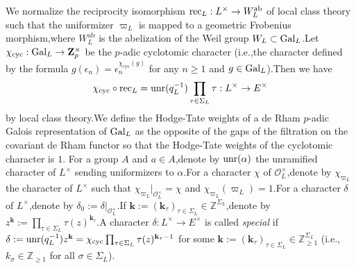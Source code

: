 \documentclass[SecEq,CM,GP]{degruyter-crelle} %
\theoremstyle{plain}
\newcommand{\ccyc}{{\chi_{\mathrm{cyc}}}}
\newcommand{\gal}{{\rm Gal}}
\newcommand{\rec}{{\rm rec}_L}
\newcommand{\unr}{{\rm unr}}
\newcommand{\BZ}{{\mathbb{Z}}}
\newcommand{\bZ}{{\mathbf{Z}}}
\newcommand{\bk}{{\mathbf{k}}}
\newcommand{\cO}{\mathcal O}
\begin{document}
We normalize the reciprocity isomorphism $\rec:L^\times\rightarrow W_L^{\mathrm{ab}}$ of local class theory such that the uniformizer $\varpi_{L}$ is mapped to a geometric Frobenius morphism,\;where $W_L^{\mathrm{ab}}$ is the abelization of the Weil group $W_L\subset \gal_L$.\;Let ${\ccyc}:\gal_L\rightarrow \bZ_p^\times$ be the $p$-adic cyclotomic character (i.e.,\;the character defined by the formula $g(\epsilon_n)=\epsilon_n^{{\ccyc}(g)}$ for any $n\geq 1$ and $g\in \gal_L$).\;Then we have 
\[{\ccyc}\circ\rec=\unr(q_L^{-1})\prod_{\tau\in \Sigma_L}\tau:L^\times\rightarrow E^\times\]
by local class theory.\;We define the Hodge-Tate weights of a de Rham $p$-adic Galois representation of $\gal_L$ as the opposite of the gaps of the filtration on the covariant de Rham functor so that the Hodge-Tate weights of the cyclotomic character is $1$.\;%
For a group $A$ and $a\in A$,\;denote by $\unr(\alpha)$ the unramified character of $L^\times$ sending uniformizers to $\alpha$.\;For a character $\chi$ of $\cO_L^\times$,\;denote by $\chi_{\varpi_L}$ the character of  $L^\times$ such that $\chi_{\varpi_L}|_{\cO_L^\times}=\chi$ and $\chi_{\varpi_L}(\varpi_L)=1$.\;For a character $\delta$ of $L^\times$,\;denote by $\delta_0:=\delta|_{\cO_L^\times}$.\;If $\bk:=(\bk_{\tau})_{\tau\in \Sigma_L}\in \BZ^{\Sigma_L}$,\;denote by $z^{\bk}:=\prod_{\tau\in  \Sigma_L}\tau(z)^{\bk_{\tau}}$.\;A character $\delta:L^\times \rightarrow E^\times$ is called \emph{special} if $\delta:=\unr(q_L^{-1})z^{\bk}={\ccyc}\prod_{\tau\in  \Sigma_L}\tau(z)^{\bk_{\tau}-1}$ for some $\bk:=(\bk_{\tau})_{\tau\in \Sigma_L}\in \BZ_{\geq 1}^{\Sigma_L}$ (i.e.,\;$k_{\sigma}\in \BZ_{\geq 1}$ for all $\sigma\in \Sigma_L$).\;
\end{document}
